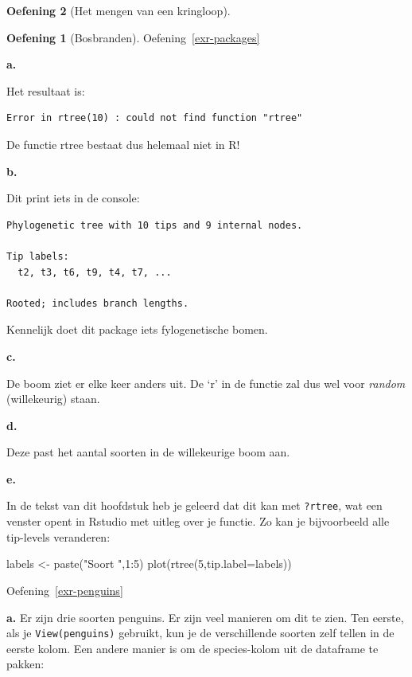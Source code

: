 \documentclass[
  a4paper,
]{scrbook}
\newenvironment{Shaded}{\begin{snugshade}}{\end{snugshade}}
\newcommand{\AttributeTok}[1]{\textcolor[rgb]{0.40,0.45,0.13}{#1}}
\newcommand{\DecValTok}[1]{\textcolor[rgb]{0.68,0.00,0.00}{#1}}
\newcommand{\FunctionTok}[1]{\textcolor[rgb]{0.28,0.35,0.67}{#1}}
\newcommand{\NormalTok}[1]{\textcolor[rgb]{0.00,0.23,0.31}{#1}}
\newcommand{\OtherTok}[1]{\textcolor[rgb]{0.00,0.23,0.31}{#1}}
\newcommand{\SpecialCharTok}[1]{\textcolor[rgb]{0.37,0.37,0.37}{#1}}
\newcommand{\StringTok}[1]{\textcolor[rgb]{0.13,0.47,0.30}{#1}}
\theoremstyle{definition}
\newtheorem{exercise}{Oefening}[chapter]
\theoremstyle{remark}
\begin{document}
\begin{exercise}[Het mengen van een
kringloop]
\begin{exercise}[Bosbranden]

Oefening~\ref{exr-packages}

\textbf{a.}

Het resultaat is:

\begin{verbatim}
Error in rtree(10) : could not find function "rtree" 
\end{verbatim}

De functie rtree bestaat dus helemaal niet in R!

\textbf{b.}

Dit print iets in de console:

\begin{verbatim}
Phylogenetic tree with 10 tips and 9 internal nodes.

Tip labels:
  t2, t3, t6, t9, t4, t7, ...

Rooted; includes branch lengths.
\end{verbatim}

Kennelijk doet dit package iets fylogenetische bomen.

\textbf{c.}

De boom ziet er elke keer anders uit. De `r' in de functie zal dus wel
voor \emph{random} (willekeurig) staan.

\textbf{d.}

Deze past het aantal soorten in de willekeurige boom aan.

\textbf{e.}

In de tekst van dit hoofdstuk heb je geleerd dat dit kan met
\texttt{?rtree}, wat een venster opent in Rstudio met uitleg over je
functie. Zo kan je bijvoorbeeld alle tip-levels veranderen:

\begin{Shaded}
\begin{Highlighting}[]
\NormalTok{labels }\OtherTok{\textless{}{-}} \FunctionTok{paste}\NormalTok{(}\StringTok{"Soort "}\NormalTok{,}\DecValTok{1}\SpecialCharTok{:}\DecValTok{5}\NormalTok{)}
\FunctionTok{plot}\NormalTok{(}\FunctionTok{rtree}\NormalTok{(}\DecValTok{5}\NormalTok{,}\AttributeTok{tip.label=}\NormalTok{labels))}
\end{Highlighting}
\end{Shaded}

Oefening~\ref{exr-penguins}

\textbf{a.} Er zijn drie soorten penguins. Er zijn veel manieren om dit
te zien. Ten eerste, als je \texttt{View(penguins)} gebruikt, kun je de
verschillende soorten zelf tellen in de eerste kolom. Een andere manier
is om de species-kolom uit de dataframe te pakken:


\end{exercise}
\end{exercise}
\end{document}
